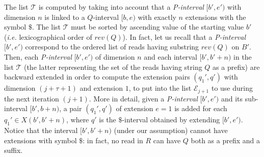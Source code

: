 \documentclass[runningheads,envcountsame,a4paper]{llncs}
\newcommand{\notaestesa}[2]{%
  {\sffamily {\bfseries #1}{\footnotesize #2}}%
  \marginpar{\framebox{\Large *}}%
}
\newcommand{\ie}{\textit{i.e.}\xspace}
\begin{document}







\begin{comment}
More precisely, the steps .... in algorithm \emph{processLinkedInterval}
directly provides the values of the new $\sigma Q$-interval and such
value is appended at the end of the new updated list (or file), in order
to maintain the lexicographic ordering.
In fact, the sorted property of the file, allows to update the files
while reading the files themselves, thus minimizing the operations on the
file.
\notaestesa{Paola}{nota bene il passo dal 3 al 9 non si capisce come sia
implementato in termini di memoria esterna ed interna - io sarei per
descrivere la procedura processLinkedInterval- dettagliandola rispetto
ai linked intervals, che però vanno definiti prima, in termini
costruttivi}.


Intervals $[b,e)$ in $\mathcal{Q}_j$ represent common strings $Q$ of
length $(j+\tau)$.
Their link to the $rev(Q)$-interval $[b',e')$ on $B'$ is easily
maintained (during the backward extension of the intervals of length
$(j+\tau-1)$ to produce the intervals in $Q_j$) by Prop.~\ref{proposition:linked-intervals}.
This list is partioned into $|\Sigma|$ files according to the starting
symbol of $Q$, and maintained sorted by ascending value of the start
$b$.
\end{comment}


The list $\mathcal{T}$ is computed by taking into account that a
\emph{P-interval} $[b', e')$ with dimension $n$ is linked to a
$Q$-interval $[b, e)$ with exactly $n$ extensions with the symbol $\$$.
The list $\mathcal{T}$ must be sorted by ascending value of the starting
value $b'$ (\ie lexicographical order of $rev(Q)$).
In fact, let us recall that a \emph{P-interval} $[b', e')$ correspond to
the ordered list of reads having substring $rev(Q)$ on $B'$.
Then, each \emph{P-interval} $[b', e')$ of dimension $n$ and each
interval $[b', b'+n)$ in the list $\mathcal{T}$ (the latter representing
the set of the reads having string $Q$ as a prefix) are backward
extended in order to compute the extension pairs $(q_{1}', q')$ with
dimension $(j+\tau+1)$ and extension $1$, to put into the list
$\mathcal{E}_{j+1}$ to use during the next iteration $(j+1)$.
More in detail, given a \emph{P-interval} $[b',e')$ and its sub-interval
$[b',b+n)$, a pair $(q_{1}',q')$ of extension $e=1$ is added for each $q_{1}'
\in X(b',b'+n)$, where $q'$ is the $\$$-interval obtained by extending
$[b',e')$.
Notice that the interval $[b', b'+n)$ (under our assumption) cannot have
extensions with symbol $\$$: in fact, no read in $R$ can have $Q$ both
as a prefix and a suffix.
\end{document}
